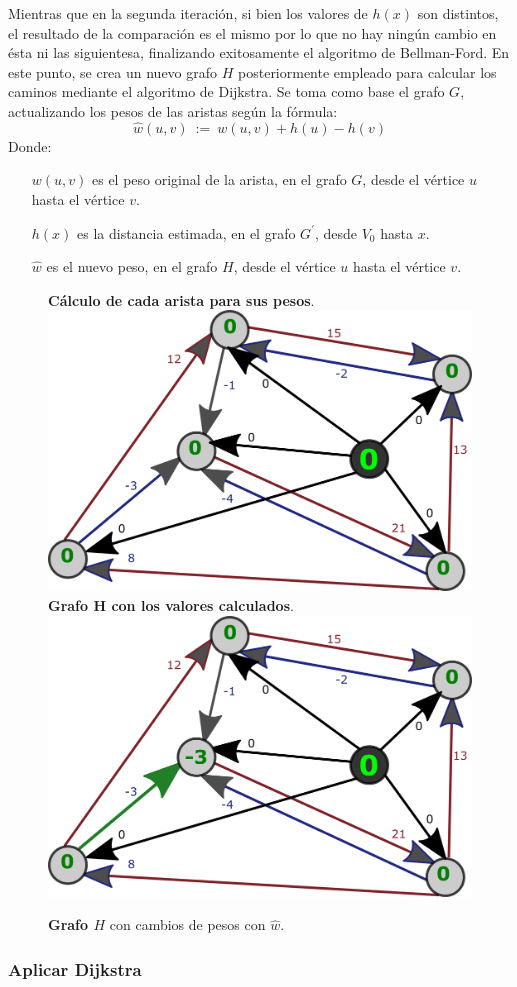 \documentclass[../tp2_grupo404.tex]{subfiles}
\begin{document}
Mientras que en la segunda iteración, si bien los valores de $h(x)$
son distintos, el resultado de la comparación es el mismo
por lo que no hay ningún cambio en ésta ni las siguientesa,
finalizando exitosamente el algoritmo de Bellman-Ford.
En este punto, se crea un nuevo grafo $H$ posteriormente empleado
para calcular los caminos mediante el algoritmo de Dijkstra.
Se toma como base el grafo $G$, actualizando los pesos de las aristas
según la fórmula:
$$\hat{w}(u,v)~:=~w(u,v) + h(u) - h(v)$$
Donde:
\begin{itemize}
    \item[$w(u,v)$] es el peso original de la arista, en el grafo $G$, desde el vértice $u$ hasta el vértice $v$.
    \item[$h(x)$] es la distancia estimada, en el grafo $G^\prime$, desde $V_0$ hasta $x$.
    \item[$\hat{w}$] es el nuevo peso, en el grafo $H$, desde el vértice $u$ hasta el vértice $v$.
\end{itemize} 

\begin{figure}[H]
    \centering
    \subcaptionbox
        {\label{fig:GrafoH_calculos}\textbf{Cálculo de cada arista para sus pesos}.}
        {\includegraphics[width=0.4\linewidth,angle=0,origin=c]{out/ford/ford1C.png}}
    \subcaptionbox
        {\label{fig:GrafoH_valores}\textbf{Grafo H con los valores calculados}.}
        {\includegraphics[width=0.4\linewidth,angle=0,origin=c]{out/ford/ford1D.png}}
    \caption{\label{fig:GrafoH}\textbf{Grafo $H$} con cambios de pesos con $\hat{w}$.}
\end{figure}

\subsubsection{Aplicar Dijkstra}\label{sec:parte1_4_2}
\end{document}

